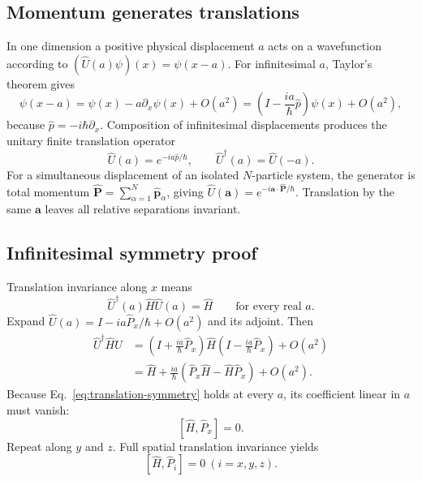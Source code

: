 \documentclass[11pt,a4paper]{article}
\theoremstyle{definition}
\newcommand{\UU}{\hat U}
\begin{document}
\subsection{Momentum generates translations}
In one dimension a positive physical displacement \(a\) acts on a wavefunction according to \((\UU(a)\psi)(x)=\psi(x-a)\). For infinitesimal \(a\), Taylor's theorem gives
\begin{equation}
\psi(x-a)=\psi(x)-a\partial_x\psi(x)+O(a^2)
=\left(I-\frac{ia}{\hbar}\hat p\right)\psi(x)+O(a^2),
\end{equation}
because \(\hat p=-i\hbar\partial_x\). Composition of infinitesimal displacements produces the unitary finite translation operator
\begin{equation}
\boxed{\UU(a)=e^{-ia\hat p/\hbar},\qquad \UU^\dagger(a)=\UU(-a).}
\end{equation}
For a simultaneous displacement of an isolated \(N\)-particle system, the generator is total momentum \(\hat{\mathbf P}=\sum_{\alpha=1}^N\hat{\mathbf p}_\alpha\), giving \(\UU(\mathbf a)=e^{-i\mathbf a\cdot\hat{\mathbf P}/\hbar}\). Translation by the same \(\mathbf a\) leaves all relative separations invariant.
\subsection{Infinitesimal symmetry proof}
Translation invariance along \(x\) means
\begin{equation}
\UU^\dagger(a)\hat H\UU(a)=\hat H\qquad\text{for every real }a.
\label{eq:translation-symmetry}
\end{equation}
Expand \(\UU(a)=I-ia\hat P_x/\hbar+O(a^2)\) and its adjoint. Then
\begin{align}
\UU^\dagger\hat H\UU
&=\left(I+\frac{ia}{\hbar}\hat P_x\right)\hat H
\left(I-\frac{ia}{\hbar}\hat P_x\right)+O(a^2)\\
&=\hat H+\frac{ia}{\hbar}(\hat P_x\hat H-\hat H\hat P_x)+O(a^2).
\end{align}
Because Eq.~\eqref{eq:translation-symmetry} holds at every \(a\), its coefficient linear in \(a\) must vanish:
\begin{equation}
\boxed{[\hat H,\hat P_x]=0.}
\end{equation}
Repeat along \(y\) and \(z\). Full spatial translation invariance yields
\begin{equation}
\boxed{[\hat H,\hat P_i]=0\ (i=x,y,z).}
\end{equation}
\end{document}
